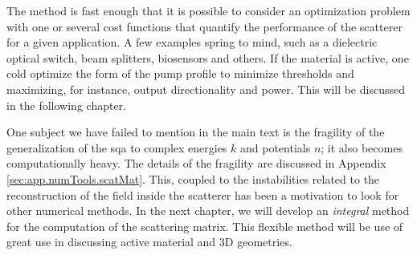 The method is fast enough that it is possible to consider
an optimization problem with one or several cost functions
that quantify the performance of the scatterer for a
given application. A few examples spring to mind, such as
a dielectric optical switch, beam splitters, biosensors and others. 
If the material is active, one cold optimize the form of the pump 
profile to minimize thresholds and maximizing, for instance, output
directionality and power. This will be discussed in the following chapter.

One subject we have failed to mention in the main text is the 
fragility of the generalization of the \gls{sqa} to complex
energies $k$ and potentials $n$; it also becomes computationally
heavy. The details of the fragility are discussed in Appendix
\ref{sec:app.numTools.scatMat}. This, coupled to the instabilities
related to the reconstruction of the field inside the scatterer
has been a motivation to look for other numerical methods. In 
the next chapter, we will develop an \textit{integral} method
for the computation of the scattering matrix. This flexible
method will be use of great use in discussing active material 
and 3D geometries. 

% 
%   
